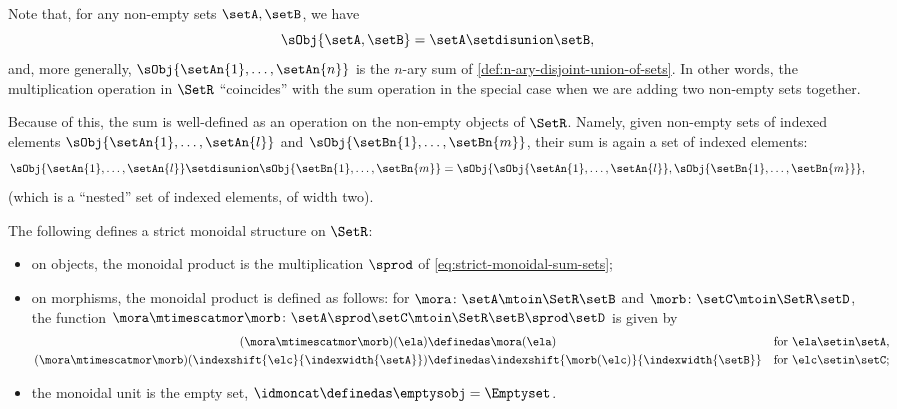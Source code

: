\begin{remark}
    Note that, for any non-empty sets $\setA, \setB$, we have
    \begin{equation}
        \sObj{\setA, \setB} = \setA \setdisunion \setB,
    \end{equation}
    and, more generally, $\sObj{\setAn{1}, \ldots, \setAn{n}}$ is the $n$-ary sum of \cref{def:n-ary-disjoint-union-of-sets}.
    In other words, the multiplication operation in $\SetR$ ``coincides'' with the sum operation in the special case when we are adding two non-empty sets together.

    Because of this, the sum is well-defined as an operation on the non-empty objects of $\SetR$.
    Namely, given non-empty sets of indexed elements $\sObj{\setAn{1}, \ldots, \setAn{l}}$ and $\sObj{\setBn{1}, \ldots, \setBn{m}}$, their sum is again a set of indexed elements:
    \begin{equation}
        \sObj{\setAn{1}, \ldots, \setAn{l}} \setdisunion \sObj{\setBn{1}, \ldots, \setBn{m}} = \sObj{\sObj{\setAn{1}, \ldots, \setAn{l}}, \sObj{\setBn{1}, \ldots, \setBn{m}}},
    \end{equation}
    (which is a ``nested'' set of indexed elements, of width two).
\end{remark}

\begin{lemma}
    \label{lem:SetR-strict-monoidal}
    The following defines a strict monoidal structure on $\SetR$:
    \begin{itemize}
        \item on objects, the monoidal product is the multiplication $\sprod$ of \cref{eq:strict-monoidal-sum-sets};
        \item on morphisms, the monoidal product is defined as follows: for $\mora \colon \setA \mtoin\SetR \setB$ and $\morb \colon \setC \mtoin\SetR \setD$, the function $\mora \mtimescatmor \morb \colon \setA \sprod \setC \mtoin\SetR \setB \sprod \setD$ is given by
              \begin{equation}
                  \label{eq:SetR-monoidal-product-morphisms}
                  \begin{aligned}
                      (\mora \mtimescatmor \morb)(\ela)                                  & \definedas \mora(\ela)                                  &  & \text{for } \ela \setin \setA, \\
                      (\mora \mtimescatmor \morb)(\indexshift{\elc}{\indexwidth{\setA}}) & \definedas \indexshift{\morb(\elc)}{\indexwidth{\setB}} &  & \text{for } \elc \setin \setC;
                  \end{aligned}
              \end{equation}
        \item the monoidal unit is the empty set, $\idmoncat \definedas \emptysobj = \Emptyset$.
    \end{itemize}
\end{lemma}

